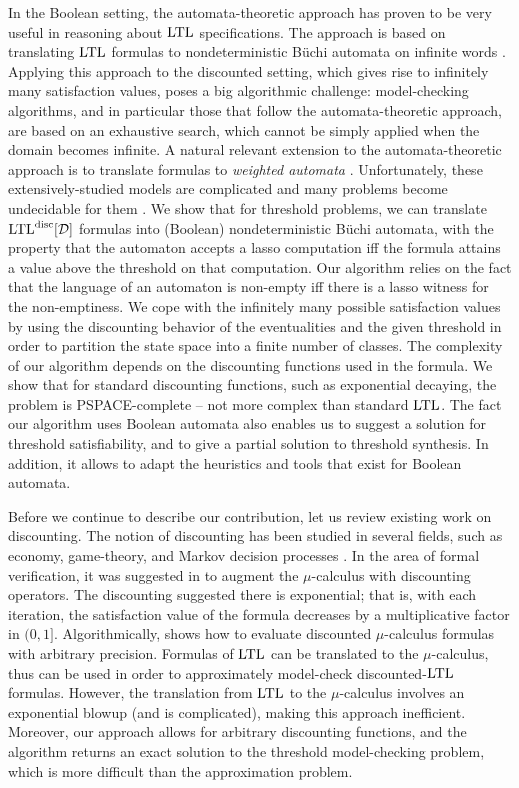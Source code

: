 \documentclass{llncs}
\newcommand{\LTL}{{\ensuremath{\rm LTL}}\xspace}
\newcommand{\D}{{\cal D}}
\newcommand{\DLTL}{\ensuremath{\LTL^{\text{disc}}[\D]}}
\begin{document}
In the Boolean setting, the automata-theoretic approach has proven to be very useful in reasoning about \LTL specifications. The approach is based on translating \LTL formulas to nondeterministic B\"uchi automata on infinite words \cite{VW86b}.
Applying this approach to the discounted setting, which gives rise to infinitely many satisfaction values, poses a big algorithmic challenge: model-checking algorithms, and in particular those that follow the automata-theoretic approach, are based on an exhaustive search, which cannot be simply applied when the domain becomes infinite.
A natural relevant extension to the automata-theoretic approach is to translate formulas to {\em weighted automata} \cite{Moh97}. Unfortunately, these extensively-studied models are complicated and many problems become undecidable for them \cite{Kro94}.
We show that for threshold problems, we can translate $\DLTL$ formulas into (Boolean) nondeterministic B\"uchi automata, with the property that the automaton accepts a lasso computation iff the formula attains a value above the threshold on that computation.
Our algorithm relies on the fact that the language of an automaton is non-empty iff there is a lasso witness for the non-emptiness.
We cope with the infinitely many possible satisfaction values by using the discounting behavior of the eventualities and the given threshold in order to partition the state space into a finite number of classes.
The complexity of our algorithm depends on the discounting functions used in the formula.
We show that for standard discounting functions, such as exponential decaying, the problem is PSPACE-complete -- not more complex than standard \LTL. 
The fact our algorithm uses Boolean automata also enables us to suggest a solution for threshold satisfiability, and to give a partial solution to threshold synthesis. In addition, it allows to adapt the heuristics and tools that exist for Boolean automata.

Before we continue to describe our contribution, let us review existing work on discounting.
The notion of discounting has been studied in several fields, such as economy, game-theory, and Markov decision processes \cite{Sha53}. In the area of formal verification, it was suggested in
\cite{AHM03} to augment the $\mu$-calculus with discounting operators. The discounting suggested there is exponential; that is, with each iteration, the satisfaction value of the formula decreases by a multiplicative factor in $(0,1]$. Algorithmically, \cite{AHM03} shows how to evaluate discounted $\mu$-calculus formulas with arbitrary precision. Formulas of $\LTL$ can be translated to the $\mu$-calculus, thus \cite{AHM03} can be used in order to approximately model-check discounted-$\LTL$ formulas. However, the translation from $\LTL$ to the $\mu$-calculus involves an exponential blowup \cite{Dam94} (and is complicated), making this approach inefficient. Moreover, our approach allows for arbitrary discounting functions, and the algorithm returns an exact solution to the threshold model-checking problem, which is more difficult than the approximation problem.
\end{document}
